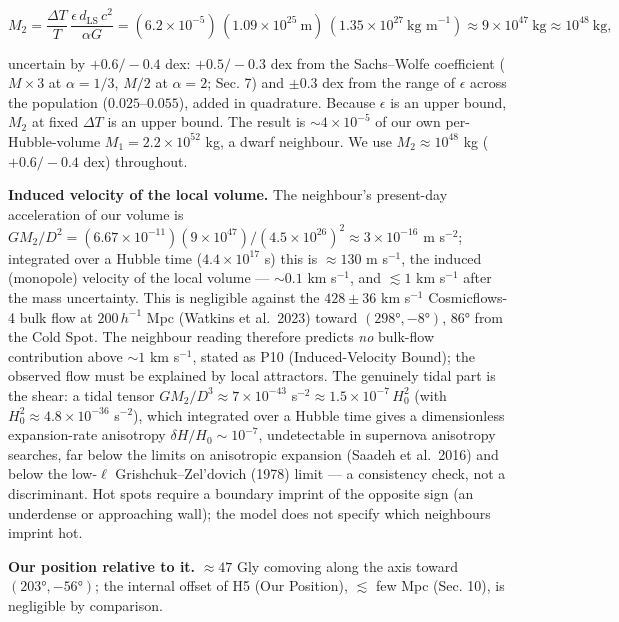 \documentclass[
]{article}
\begin{document}
\[M_2 = \frac{\Delta T}{T}\,\frac{\epsilon\,d_{\text{LS}}\,c^2}{\alpha G} = (6.2\times10^{-5})\,(1.09\times10^{25}\ \text{m})\,(1.35\times10^{27}\ \text{kg m}^{-1}) \approx 9\times10^{47}\ \text{kg} \approx 10^{48}\ \text{kg},\]

uncertain by \(+0.6/-0.4\) dex: \(+0.5/-0.3\) dex from the Sachs--Wolfe
coefficient (\(M \times 3\) at \(\alpha = 1/3\), \(M/2\) at
\(\alpha = 2\); Sec. 7) and \(\pm 0.3\) dex from the range of
\(\epsilon\) across the population (\(0.025\)--\(0.055\)), added in
quadrature. Because \(\epsilon\) is an upper bound, \(M_2\) at fixed
\(\Delta T\) is an upper bound. The result is \(\sim\!4\times10^{-5}\)
of our own per-Hubble-volume \(M_1 = 2.2\times10^{52}\) kg, a dwarf
neighbour. We use \(M_2 \approx 10^{48}\) kg (\(+0.6/-0.4\) dex)
throughout.

\textbf{Induced velocity of the local volume.} The neighbour's
present-day acceleration of our volume is
\(GM_2/D^2 = (6.67\times10^{-11})(9\times10^{47})/(4.5\times10^{26})^2 \approx 3\times10^{-16}\)
m s\(^{-2}\); integrated over a Hubble time (\(4.4\times10^{17}\) s)
this is \(\approx 130\) m s\(^{-1}\), the induced (monopole) velocity of
the local volume --- \(\sim\!0.1\) km s\(^{-1}\), and \(\lesssim 1\) km
s\(^{-1}\) after the mass uncertainty. This is negligible against the
\(428 \pm 36\) km s\(^{-1}\) Cosmicflows-4 bulk flow at \(200\,h^{-1}\)
Mpc (Watkins et al.~2023) toward \((298°, -8°)\), \(86°\) from the Cold
Spot. The neighbour reading therefore predicts \emph{no} bulk-flow
contribution above \(\sim\!1\) km s\(^{-1}\), stated as P10
(Induced-Velocity Bound); the observed flow must be explained by local
attractors. The genuinely tidal part is the shear: a tidal tensor
\(GM_2/D^3 \approx 7\times10^{-43}\)
s\(^{-2} \approx 1.5\times10^{-7}\,H_0^2\) (with
\(H_0^2 \approx 4.8\times10^{-36}\) s\(^{-2}\)), which integrated over a
Hubble time gives a dimensionless expansion-rate anisotropy
\(\delta H/H_0 \sim 10^{-7}\), undetectable in supernova anisotropy
searches, far below the limits on anisotropic expansion (Saadeh et
al.~2016) and below the low-\(\ell\) Grishchuk--Zel'dovich (1978) limit
--- a consistency check, not a discriminant. Hot spots require a
boundary imprint of the opposite sign (an underdense or approaching
wall); the model does not specify which neighbours imprint hot.

\textbf{Our position relative to it.} \(\approx 47\) Gly comoving along
the axis toward \((203°, -56°)\); the internal offset of H5 (Our
Position), \(\lesssim\) few Mpc (Sec. 10), is negligible by comparison.
\end{document}
